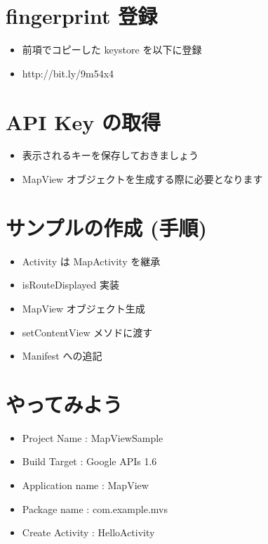 \documentclass[slide,papersize]{jsarticle}
\begin{document}
\section*{fingerprint 登録}
\bigskip
\begin{itemize}
\item 前項でコピーした keystore を以下に登録
\bigskip
\item http://bit.ly/9m54x4
\end{itemize}

\section*{API Key の取得}
\bigskip
\begin{itemize}
\item 表示されるキーを保存しておきましょう
\bigskip
\item MapView オブジェクトを生成する際に必要となります
\end{itemize}

\section*{サンプルの作成 (手順)}
\bigskip
\begin{itemize}
\item Activity は MapActivity を継承
\bigskip
\item isRouteDisplayed 実装
\bigskip
\item MapView オブジェクト生成
\bigskip
\item setContentView メソドに渡す
\bigskip
\item Manifest への追記
\end{itemize}

\section*{やってみよう}
\bigskip
\begin{itemize}
\item Project Name : MapViewSample
\medskip
\item Build Target : Google APIs 1.6
\medskip
\item Application name : MapView
\medskip
\item Package name : com.example.mvs
\medskip
\item Create Activity : HelloActivity
\end{itemize}

\end{document}
